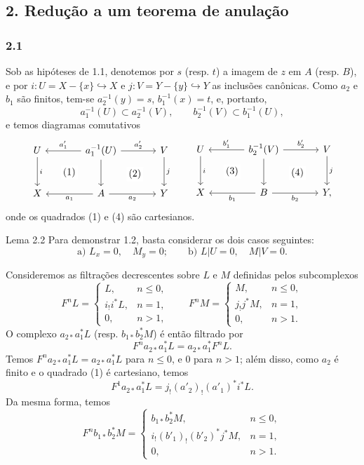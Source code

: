 \subsection*{2. Redução a um teorema de anulação}

\subsubsection*{2.1}
Sob as hipóteses de 1.1, denotemos por $s$ (resp. $t$) a imagem de $z$ em $A$ (resp. $B$), e por $i:U=X-\{x\}\hookrightarrow X$ e $j:V=Y-\{y\}\hookrightarrow Y$ as inclusões canônicas. Como $a_2$ e $b_1$ são finitos, tem-se $a_2^{-1}(y)=s$, $b_1^{-1}(x)=t$, e, portanto,
\[
a_1^{-1}(U)\subset a_2^{-1}(V),\qquad b_2^{-1}(V)\subset b_1^{-1}(U),
\]
e temos diagramas comutativos
\[
\begin{tikzcd}[column sep=large,row sep=large]
U \arrow[d,"i"] \arrow[rd,phantom,"(1)"{description}] & a_1^{-1}(U) \arrow[l,"a'_1"'] \arrow[r,"a'_2"] \arrow[d] \arrow[rd,phantom,"(2)"{description}] & V \arrow[d,"j"]\\
X & A \arrow[l,"a_1"] \arrow[r,"a_2"'] & Y
\end{tikzcd}
\qquad
\begin{tikzcd}[column sep=large,row sep=large]
U \arrow[d,"i"] \arrow[rd,phantom,"(3)"{description}] & b_2^{-1}(V) \arrow[l,"b'_1"'] \arrow[r,"b'_2"] \arrow[d] \arrow[rd,phantom,"(4)"{description}] & V \arrow[d,"j"]\\
X & B \arrow[l,"b_1"] \arrow[r,"b_2"'] & Y ,
\end{tikzcd}
\]
onde os quadrados (1) e (4) são cartesianos.

\begin{statement}{Lema 2.2}
Para demonstrar 1.2, basta considerar os dois casos seguintes:
\[
\text{a) } L_x=0,\quad M_y=0;\qquad
\text{b) } L|U=0,\quad M|V=0 .
\]
\end{statement}

Consideremos as filtrações decrescentes sobre $L$ e $M$ definidas pelos subcomplexos
\[
F^nL=
\begin{cases}
L,& n\le 0,\\
i_!i^*L,& n=1,\\
0,& n>1,
\end{cases}
\qquad
F^nM=
\begin{cases}
M,& n\le 0,\\
j_!j^*M,& n=1,\\
0,& n>1.
\end{cases}
\]
O complexo $a_{2*}a_1^*L$ (resp. $b_{1*}b_2^*M$) é então filtrado por
\[
F^n a_{2*}a_1^*L=a_{2*}a_1^*F^nL.
\]
Temos $F^n a_{2*}a_1^*L=a_{2*}a_1^*L$ para $n\le 0$, e $0$ para $n>1$; além disso, como $a_2$ é finito e o quadrado (1) é cartesiano, temos
\[
F^1a_{2*}a_1^*L=j_!(a'_2)_!(a'_1)^*i^*L.
\]
Da mesma forma, temos
\[
F^n b_{1*}b_2^*M=
\begin{cases}
b_{1*}b_2^*M,& n\le 0,\\
i_!(b'_1)_!(b'_2)^*j^*M,& n=1,\\
0,& n>1.
\end{cases}
\]

